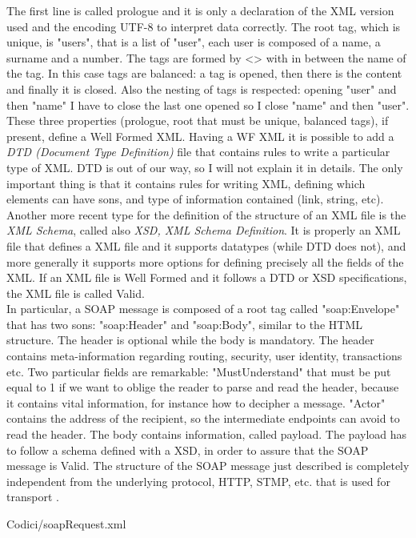 The first line is called prologue and it is only a declaration of the XML version used and the encoding UTF-8 to interpret data correctly. The root tag, which is unique, is "users", that is a list of "user", each user is composed of a name, a surname and a number. The tags are formed by <> with in between the name of the tag. In this case tags are balanced: a tag is opened, then there is the content and finally it is closed. Also the nesting of tags is respected: opening "user" and then "name" I have to close the last one opened so I close "name" and then "user". These three properties (prologue, root that must be unique, balanced tags), if present, define a Well Formed XML. Having a WF XML it is possible to add a \textit{DTD (Document Type Definition)} file that contains rules to write a particular type of XML. DTD is out of our way, so I will not explain it in details. The only important thing is that it contains rules for writing XML, defining which elements can have sons, and type of information contained (link, string, etc). Another more recent type for the definition of the structure of an XML file is the \textit{XML Schema}, called also \textit{XSD, XML Schema Definition}. It is properly an XML file that defines a XML file and it supports datatypes (while DTD does not), and more generally it supports more options for defining precisely all the fields of the XML. If an XML file is Well Formed and it follows a DTD or XSD specifications, the XML file is called Valid.\\
In particular, a SOAP message is composed of a root tag called "soap:Envelope" that has two sons: "soap:Header" and "soap:Body", similar to the HTML structure. The header is optional while the body is mandatory. The header contains meta-information regarding routing, security, user identity, transactions etc. Two particular fields are remarkable: "MustUnderstand" that must be put equal to 1 if we want to oblige the reader to parse and read the header, because it contains vital information, for instance how to decipher a message. "Actor" contains the address of the recipient, so the intermediate endpoints can avoid to read the header. The body contains information, called payload. The payload has to follow a schema defined with a XSD, in order to assure that the SOAP message is Valid. The structure of the SOAP message just described is completely independent from the underlying protocol, HTTP, STMP, etc. that is used for transport \cite{soapMessage}.

\begin{lstinputlisting}[
		language=XML,
    morekeywords={ciao,soap:Envelope,soap:Header,soap:Body,m:GetQuotation,m:QuotationsName,ns1:applicationName,ns1:networkCode,ns1:RequestHeader,bye},
		caption={SOAP message example},
		label=lst:soap]
		{Codici/soapRequest.xml}
\end{lstinputlisting}

